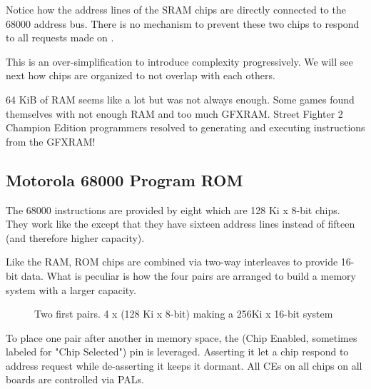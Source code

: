 Notice how the address lines of the SRAM chips are directly connected to the 68000 address bus. There is no mechanism to prevent these two chips to respond to all requests made on \icode{[0x**0000-0x**7FFF]}. 

This is an over-simplification to introduce complexity progressively. We will see next how chips are organized to not overlap with each others.

 \begin{trivia}
 64 KiB of RAM seems like a lot but was not always enough. Some games found themselves with not enough RAM and too much GFXRAM. Street Fighter 2 Champion Edition programmers resolved to generating and executing instructions from the GFXRAM\cite{mame_driver}!
 \end{trivia}
\pagebreak








\subsection{Motorola 68000 Program ROM}


The 68000 instructions are provided by eight  which are 128 Ki x 8-bit chips. They work like the  except that they have sixteen address lines instead of fifteen (and therefore higher capacity).

Like the RAM, ROM chips are combined via two-way interleaves to provide 16-bit data. What is peculiar is how the four pairs are arranged to build a memory system with a larger capacity.


\begin{figure}[H]
\caption*{Two first pairs. 4 x (128 Ki x 8-bit) making a 256Ki x 16-bit system}
\end{figure}

To place one pair after another in memory space, the  (Chip Enabled, sometimes labeled  for "Chip Selected") pin is leveraged. Asserting it let a chip respond to address request while de-asserting it keeps it dormant. All CEs on all chips on all boards are controlled via PALs.

